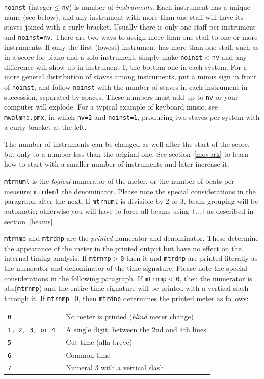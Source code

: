 \documentclass[11pt]{article}
\def\newfrom{2.59}  %
\def\NEW#1{\ifdim#1 pt<\newfrom pt\else%
\marginpar{\fbox{#1}}\fi}
\begin{document}
{\tt noinst} (integer$\leq${\tt nv}) is number of {\it instruments}.  Each 
instrument has a unique name (see below), and any instrument
with more than one staff will have its staves joined with a curly bracket. 
Usually there is only one staff per instrument and {\tt noinst=nv}.  There
are two ways to assign more than one staff to one or more instruments. 
If only the first (lowest) instrument has more than one staff, such as in
a score for piano and a solo instrument, simply make
{\tt noinst$<$nv} and any difference will show up in instrument 1, the bottom
one in each system.  
\NEW{1.4} For a
more general distribution of staves among instruments, 
put a minus sign in front of {\tt noinst},
and follow {\tt noinst} with the number of staves in each  instrument  in
succession, separated by spaces.  These numbers must add up to {\tt nv} or your
computer will explode.  For a typical example of keyboard music, see 
{\tt mwalmnd.pmx}, in which {\tt nv=2} and {\tt noinst=1}, producing two 
staves per system with a curly bracket at the left.  

The number of instruments can be changed as well after the start of the 
score, but only to a number less than the original one.  See 
section~\ref{movbrk} to learn how to start with a smaller
number of instruments and later increase it.  

{\tt mtrnuml} is the {\it logical} numerator of the meter, or the number of 
beats per measure; {\tt mtrdenl} the denominator.  Please note the special
considerations in the paragraph after the next. If {\tt mtrnuml} is 
divisible by 2 or 3, beam grouping will be automatic; otherwise you will
have to force all beams using {\tt [}$\dots${\tt ]} as described in 
section~\ref{beams}.

{\tt mtrnmp} and {\tt mtrdnp} are the {\it printed} numerator and denominator.  
These determine the appearance of the meter in the printed output but 
have no effect on the internal timing analysis.  If {\tt mtrnmp$>$0} then it 
and {\tt mtrdnp} are printed literally as the numerator and denominator 
of the time signature.  Please note the special considerations in the following 
paragraph. If 
{\tt mtrnmp$<$0}, then the numerator is abs({\tt mtrnmp}) and the 
entire time signature will be printed with a vertical slash through 
it.  If {\tt mtrnmp}=0, then {\tt mtrdnp} determines the printed meter 
as follows: 

\medskip

\begin{tabular}{ll}
\tt 0 & No meter is printed ({\it blind} meter change)\\
\tt 1, 2, 3, or 4 & A single digit, between the 2nd and 4th lines\\
\tt 5 &  Cut time (alla breve)\\
\tt 6 &  Common time\\
\tt 7 &  Numeral 3 with a vertical slash\\
\end{tabular}
\end{document}
